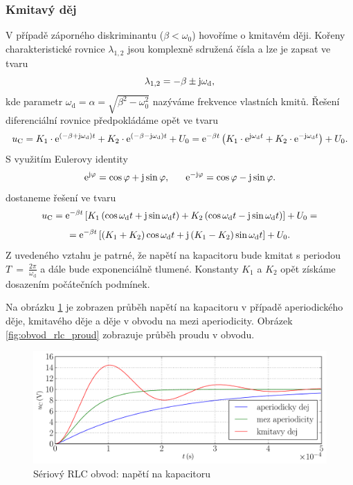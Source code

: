 \subsubsection{Kmitavý děj}

V případě záporného diskriminantu ($\beta < \omega_0$) hovoříme o kmitavém ději. Kořeny charakteristické rovnice $\lambda_{1,2}$ jsou komplexně sdružená čísla a lze je zapsat ve tvaru
$$
\lambda_{1,2} = - \beta \pm \mathrm{j} \omega_\mathrm{d},
$$
kde parametr $\omega_\mathrm{d} = \alpha = \sqrt{\beta^2 - \omega_0^2}$ nazýváme frekvence vlastních kmitů. Řešení diferenciální rovnice předpokládáme opět ve tvaru
$$
u_\mathrm{C} = K_1 \cdot \mathrm{e}^{\left( - \beta + \mathrm{j} \omega_\mathrm{d} \right) t} + K_2 \cdot \mathrm{e}^{\left(- \beta - \mathrm{j} \omega_\mathrm{d} \right) t} + U_0 = \mathrm{e}^{- \beta t} \left( K_1 \cdot \mathrm{e}^{\mathrm{j} \omega_\mathrm{d} t} + K_2 \cdot \mathrm{e}^{- \mathrm{j} \omega_\mathrm{d} t} \right) + U_0.
$$
S využitím Eulerovy identity
$$
\mathrm{e}^{\mathrm{j} \varphi} = \cos \varphi + \mathrm{j} \sin \varphi,~~~~~
\mathrm{e}^{- \mathrm{j} \varphi} = \cos \varphi - \mathrm{j} \sin \varphi.
$$
dostaneme řešení ve tvaru
$$
u_\mathrm{C} = \mathrm{e}^{- \beta t} \left[ K_1 \left( \cos \omega_\mathrm{d} t + \mathrm{j} \sin \omega_\mathrm{d} t \right) + K_2 \left( \cos \omega_\mathrm{d} t - \mathrm{j} \sin \omega_\mathrm{d} t \right) \right] + U_0 =
$$
$$
= \mathrm{e}^{- \beta t} \left[ \left( K_1 + K_2 \right) \cos \omega_\mathrm{d} t + \mathrm{j} \left( K_1 - K_2 \right) \sin \omega_\mathrm{d} t \right] + U_0.
$$
Z uvedeného vztahu je patrné, že napětí na kapacitoru bude kmitat s periodou $T~=~\frac{2 \pi}{\omega_\mathrm{d}}$ a dále bude exponenciálně tlumené. Konstanty $K_1$ a $K_2$ opět získáme dosazením počátečních podmínek.

Na obrázku \ref{fig:obvod_rlc_napeti} je zobrazen průběh napětí na kapacitoru v případě aperiodického děje, kmitavého děje a děje v obvodu na mezi aperiodicity. Obrázek \ref{fig:obvod_rlc_proud} zobrazuje průběh proudu v obvodu.

\begin{figure}[h!]
\centering
\includegraphics[width=13cm]{prechodne_jevy/druhy_rad/obvod_rlc_napeti.pdf}
\caption{Sériový RLC obvod: napětí na kapacitoru}
\label{fig:obvod_rlc_napeti}
\end{figure}

